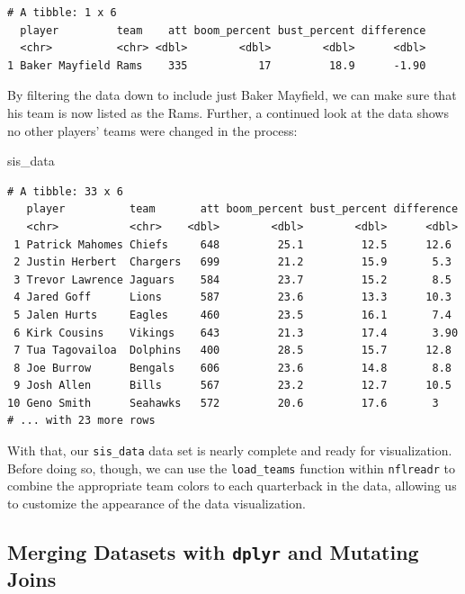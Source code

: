 \documentclass[
  letterpaper,
]{krantz}
\newenvironment{Shaded}{\begin{snugshade}}{\end{snugshade}}
\newcommand{\NormalTok}[1]{\textcolor[rgb]{0.00,0.23,0.31}{#1}}
\begin{document}
\begin{verbatim}
# A tibble: 1 x 6
  player         team    att boom_percent bust_percent difference
  <chr>          <chr> <dbl>        <dbl>        <dbl>      <dbl>
1 Baker Mayfield Rams    335           17         18.9      -1.90
\end{verbatim}

By filtering the data down to include just Baker Mayfield, we can make
sure that his team is now listed as the Rams. Further, a continued look
at the data shows no other players' teams were changed in the process:

\begin{Shaded}
\begin{Highlighting}[]
\NormalTok{sis\_data}
\end{Highlighting}
\end{Shaded}

\begin{verbatim}
# A tibble: 33 x 6
   player          team       att boom_percent bust_percent difference
   <chr>           <chr>    <dbl>        <dbl>        <dbl>      <dbl>
 1 Patrick Mahomes Chiefs     648         25.1         12.5      12.6 
 2 Justin Herbert  Chargers   699         21.2         15.9       5.3 
 3 Trevor Lawrence Jaguars    584         23.7         15.2       8.5 
 4 Jared Goff      Lions      587         23.6         13.3      10.3 
 5 Jalen Hurts     Eagles     460         23.5         16.1       7.4 
 6 Kirk Cousins    Vikings    643         21.3         17.4       3.90
 7 Tua Tagovailoa  Dolphins   400         28.5         15.7      12.8 
 8 Joe Burrow      Bengals    606         23.6         14.8       8.8 
 9 Josh Allen      Bills      567         23.2         12.7      10.5 
10 Geno Smith      Seahawks   572         20.6         17.6       3   
# ... with 23 more rows
\end{verbatim}

With that, our \texttt{sis\_data} data set is nearly complete and ready
for visualization. Before doing so, though, we can use the
\texttt{load\_teams} function within \texttt{nflreadr} to combine the
appropriate team colors to each quarterback in the data, allowing us to
customize the appearance of the data visualization.

\hypertarget{merging-datasets-with-dplyr-and-mutating-joins}{%
\subsection{\texorpdfstring{Merging Datasets with \texttt{dplyr} and
Mutating
Joins}{Merging Datasets with dplyr and Mutating Joins}}\label{merging-datasets-with-dplyr-and-mutating-joins}}
\end{document}
